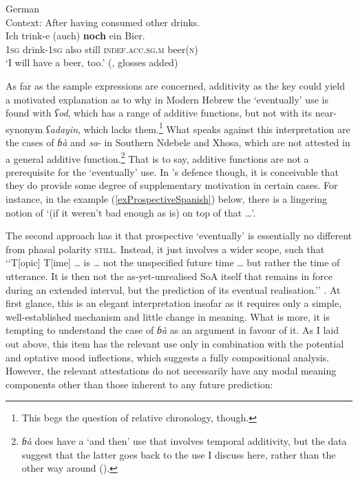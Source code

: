 \begin{exe}
	\ex German\label{exProspectiveGermanBier}\\
	Context: After having consumed other drinks.\\
	\gll Ich trink-e (auch) \textbf{noch} ein Bier.\\
	1\textsc{sg} drink-1\textsc{sg} \phantom{(}also still \textsc{indef}.\textsc{acc}.\textsc{sg}.\textsc{m} 	beer(\textsc{n})\\
	\glt \lq I will have a beer, too.\rq{ }(\cite[143]{Koenig1991}, glosses added)
\end{exe}

As far as the sample expressions are concerned, additivity as the key could yield a motivated explanation as to why in Modern Hebrew the \lq eventually\rq{ }use is found with \textit{ʕod}, which has a range of additive functions, but not with its near-synonym \textit{ʕadayin}, which lacks them.\footnote{This begs the question of relative chronology, though.} What speaks against this interpretation are the cases of  \textit{ɓà} and \mbox{\textit{sa}-} in Southern Ndebele and Xhosa, which are not attested in a general additive function.\footnote{ \textit{ɓà} does have a  \lq and then\rq{ }use that involves temporal additivity, but the data suggest that the latter goes back to the use I discuss here, rather than the other way around ().} That is to say, additive functions are not a prerequisite for the \lq{}eventually\rq{ }use. In \citeauthor{KoenigTraugott1982}'s defence though, it is conceivable that they do provide some degree of supplementary motivation in certain cases. For instance, in the  example (\ref{exProspectiveSpanish}) below, there is a lingering notion of \lq (if it weren’t bad enough as is) on top of that …\rq{}.

The second approach has it that prospective \lq eventually\rq{ }is essentially no different from phasal polarity \textsc{still}. Instead, it just involves a wider scope, such that \lq\lq T[opic] T[ime] … is … not the unspecified future time … but rather the time of utterance. It is then not the as-yet-unrealised SoA itself that remains in force during an extended interval, but the prediction of its eventual realisation.\rq\rq{ }\parencite[147]{MosegaardHansen2008}. At first glance, this is an elegant interpretation insofar as it requires only a simple, well-established mechanism and little change in meaning. What is more, it is tempting to understand the case of  \textit{ɓà} as an argument in favour of it. As I laid out above, this item has the relevant use only in combination with the potential and optative mood inflections, which suggests a fully compositional analysis. However, the relevant attestations do not necessarily have  any modal meaning components other than those inherent to any future prediction:

